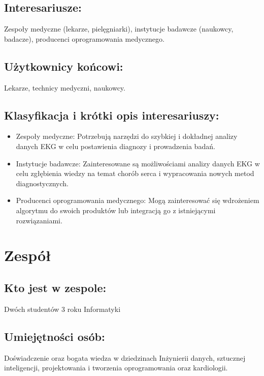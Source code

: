 \documentclass[12pt]{article}
\begin{document}
        \subsection*{Interesariusze:}
            Zespoły medyczne (lekarze, pielęgniarki), instytucje badawcze (naukowcy, badacze), producenci oprogramowania medycznego.  

        \subsection*{Użytkownicy końcowi:}
            Lekarze, technicy medyczni, naukowcy.  

        \subsection*{Klasyfikacja i krótki opis interesariuszy:}

            \begin{itemize}
                \item
                Zespoły medyczne: Potrzebują narzędzi do szybkiej i dokładnej analizy danych EKG w celu postawienia diagnozy i prowadzenia badań.  

                \item
                Instytucje badawcze: Zainteresowane są możliwościami analizy danych EKG w celu zgłębienia wiedzy na temat chorób serca i wypracowania nowych metod diagnostycznych.  

                \item
                Producenci oprogramowania medycznego: Mogą zainteresować się wdrożeniem algorytmu do swoich
                produktów lub integracją go z istniejącymi rozwiązaniami.
            \end{itemize}

    \section{Zespół}
        
        \subsection*{Kto jest w zespole:}
            Dwóch studentów 3 roku Informatyki 

        \subsection*{Umiejętności osób:}
            Doświadczenie oraz bogata wiedza w dziedzinach Inżynierii danych, sztucznej inteligencji, projektowania i tworzenia oprogramowania oraz kardiologii. 
\end{document}
